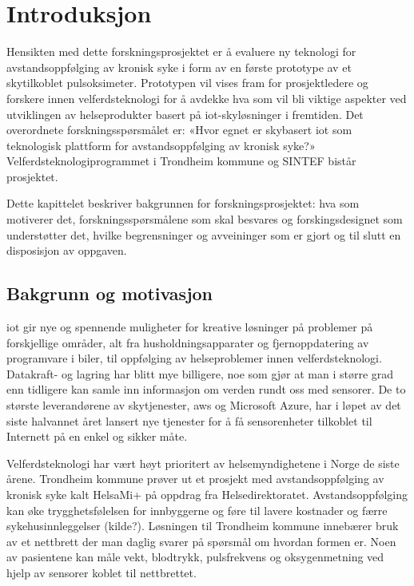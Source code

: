 \chapter{Introduksjon}
\label{ch:introduction}
Hensikten med dette forskningsprosjektet er å evaluere ny teknologi for avstandsoppfølging av kronisk
syke i form av en første prototype av et skytilkoblet pulsoksimeter. Prototypen
vil vises fram for prosjektledere og forskere innen velferdsteknologi for
å avdekke hva som vil bli viktige aspekter ved utviklingen av helseprodukter
basert på \gls{iot}-skyløsninger i fremtiden.
Det overordnete forskningsspørsmålet er: «Hvor egnet er skybasert \acrfull{iot} som teknologisk plattform for avstandsoppfølging av kronisk syke?»
Velferdsteknologiprogrammet i Trondheim kommune og SINTEF bistår prosjektet.

Dette kapittelet beskriver bakgrunnen for forskningsprosjektet: hva som motiverer det,
forskningsspørsmålene som skal besvares og forskingsdesignet som understøtter det,
hvilke begrensninger og avveininger som er gjort og til slutt en disposisjon av oppgaven.

\section{Bakgrunn og motivasjon}
\gls{iot} gir nye og spennende muligheter for kreative løsninger på problemer på forskjellige områder, alt fra husholdningsapparater
og fjernoppdatering av programvare i biler, til oppfølging av helseproblemer innen velferdsteknologi. Datakraft- og lagring
har blitt mye billigere, noe som gjør at man i større grad enn tidligere kan samle inn informasjon om verden rundt oss
med sensorer. De to største leverandørene av skytjenester, \gls{aws} og Microsoft Azure,
har i løpet av det siste halvannet året lansert nye tjenester for å få sensorenheter tilkoblet til Internett
på en enkel og sikker måte.

Velferdsteknologi har vært høyt prioritert av helsemyndighetene i Norge de siste årene. Trondheim kommune prøver ut
et prosjekt med avstandsoppfølging av kronisk syke kalt HelsaMi+ på oppdrag fra Helsedirektoratet. 
Avstandsoppfølging kan øke trygghetsfølelsen for innbyggerne og føre til lavere kostnader og færre sykehusinnleggelser (kilde?).
Løsningen til Trondheim kommune innebærer bruk av et nettbrett der man daglig svarer på spørsmål om hvordan formen er. Noen av pasientene
kan måle vekt, blodtrykk, pulsfrekvens og oksygenmetning ved hjelp av sensorer koblet til nettbrettet.

